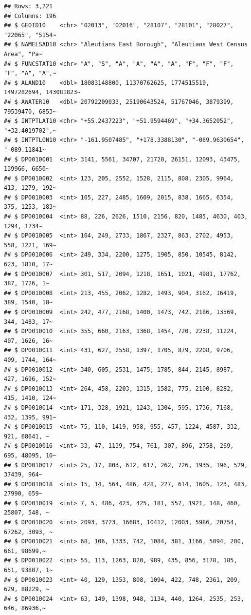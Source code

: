 \documentclass[]{article}
\begin{document}
\begin{verbatim}
## Rows: 3,221
## Columns: 196
## $ GEOID10    <chr> "02013", "02016", "28107", "28101", "28027", "22065", "5154~
## $ NAMELSAD10 <chr> "Aleutians East Borough", "Aleutians West Census Area", "Pa~
## $ FUNCSTAT10 <chr> "A", "S", "A", "A", "A", "A", "F", "F", "F", "F", "A", "A",~
## $ ALAND10    <dbl> 18083148800, 11370762625, 1774515519, 1497282694, 143081823~
## $ AWATER10   <dbl> 20792209033, 25190643524, 51767046, 3879399, 79539470, 6853~
## $ INTPTLAT10 <chr> "+55.2437223", "+51.9594469", "+34.3652052", "+32.4019702",~
## $ INTPTLON10 <chr> "-161.9507485", "+178.3388130", "-089.9630654", "-089.11841~
## $ DP0010001  <int> 3141, 5561, 34707, 21720, 26151, 12093, 43475, 139966, 6650~
## $ DP0010002  <int> 123, 205, 2552, 1528, 2115, 808, 2305, 9964, 413, 1279, 192~
## $ DP0010003  <int> 105, 227, 2485, 1609, 2015, 838, 1665, 6354, 375, 1253, 183~
## $ DP0010004  <int> 88, 226, 2626, 1510, 2156, 820, 1485, 4630, 403, 1294, 1734~
## $ DP0010005  <int> 104, 249, 2733, 1867, 2327, 863, 2702, 4953, 558, 1221, 169~
## $ DP0010006  <int> 249, 334, 2200, 1275, 1905, 850, 10545, 8142, 623, 1810, 17~
## $ DP0010007  <int> 301, 517, 2094, 1218, 1651, 1021, 4981, 17762, 387, 1726, 1~
## $ DP0010008  <int> 213, 455, 2062, 1282, 1493, 904, 3162, 16419, 389, 1540, 18~
## $ DP0010009  <int> 242, 477, 2168, 1400, 1473, 742, 2186, 13569, 344, 1483, 17~
## $ DP0010010  <int> 355, 660, 2163, 1368, 1454, 720, 2238, 11224, 407, 1626, 16~
## $ DP0010011  <int> 431, 627, 2558, 1397, 1705, 879, 2208, 9706, 409, 1744, 164~
## $ DP0010012  <int> 340, 605, 2531, 1475, 1785, 844, 2145, 8987, 427, 1696, 152~
## $ DP0010013  <int> 264, 458, 2203, 1315, 1582, 775, 2100, 8282, 415, 1410, 124~
## $ DP0010014  <int> 171, 328, 1921, 1243, 1304, 595, 1736, 7168, 432, 1395, 991~
## $ DP0010015  <int> 75, 110, 1419, 958, 955, 457, 1224, 4587, 332, 921, 68641, ~
## $ DP0010016  <int> 33, 47, 1139, 754, 761, 307, 896, 2758, 269, 695, 48095, 10~
## $ DP0010017  <int> 25, 17, 803, 612, 617, 262, 726, 1935, 196, 529, 37439, 964~
## $ DP0010018  <int> 15, 14, 564, 486, 428, 227, 614, 1605, 123, 483, 27990, 659~
## $ DP0010019  <int> 7, 5, 486, 423, 425, 181, 557, 1921, 148, 460, 25807, 548, ~
## $ DP0010020  <int> 2093, 3723, 16683, 10412, 12003, 5986, 20754, 67262, 3093, ~
## $ DP0010021  <int> 68, 106, 1333, 742, 1084, 381, 1166, 5094, 200, 661, 98699,~
## $ DP0010022  <int> 55, 113, 1263, 820, 989, 435, 856, 3178, 185, 651, 93807, 1~
## $ DP0010023  <int> 40, 129, 1353, 808, 1094, 422, 748, 2361, 209, 629, 88229, ~
## $ DP0010024  <int> 63, 149, 1398, 948, 1134, 440, 1264, 2535, 253, 646, 86936,~

\end{verbatim}
\end{document}
